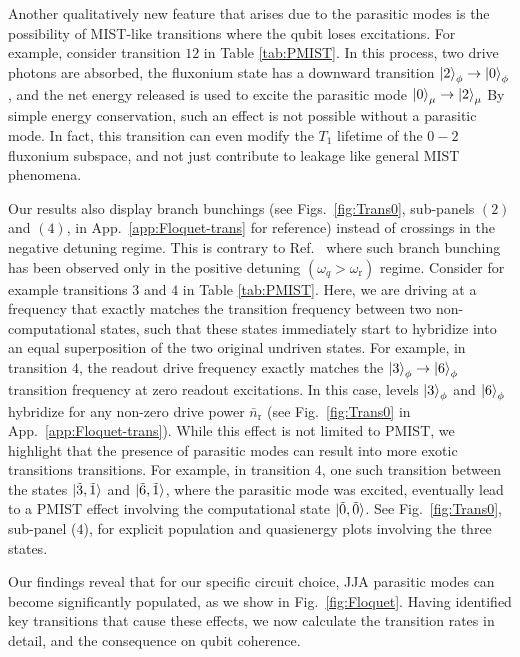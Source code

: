 \documentclass[%
reprint,
superscriptaddress,
 amsmath,amssymb,
 aps,
 prx,
longbibliography,
floatfix,
]{revtex4-2}
\begin{document}
Another qualitatively new feature that arises due to the parasitic modes is the possibility of MIST-like transitions where the qubit loses excitations.  For example, consider transition $12$ in Table \ref{tab:PMIST}. In this process, two drive photons are absorbed, the fluxonium state has a downward transition $\ket{2}_\phi\rightarrow\ket{0}_\phi$, and the net energy released is used to excite the parasitic mode $\ket{0}_\mu\rightarrow \ket{2}_\mu$ By simple energy conservation, such an effect is not possible without a parasitic mode. In fact, this transition can even modify the $T_1$ lifetime of the $0-2$ fluxonium subspace, and not just contribute to leakage like general MIST phenomena.

Our results also display branch bunchings (see Figs.~\ref{fig:Trans0}, sub-panels $(2)$ and $(4)$, in App.~\ref{app:Floquet-trans} for reference) instead of crossings in the negative detuning regime. This is contrary to Ref.~\cite{dumas2024unified} where such branch bunching has been observed only in the positive detuning $(\omega_q>\omega_\textrm{r})$ regime.  Consider for example transitions $3$ and $4$ in Table \ref{tab:PMIST}. Here, we are  driving at a frequency that exactly matches the transition frequency between two non-computational states, such that these states immediately start to hybridize into an equal superposition of the two 
original undriven states.  For example, in transition $4$, the readout drive frequency exactly matches the $\ket{3}_\phi \rightarrow \ket{6}_\phi$ transition frequency at zero readout excitations. In this case, levels $\ket{3}_\phi$ and $\ket{6}_\phi$ hybridize for any non-zero drive power $\bar n_\textrm{r}$  (see Fig.~\ref{fig:Trans0} in App.~\ref{app:Floquet-trans}). While this effect is not limited to PMIST, we highlight that the presence of parasitic modes can result into more exotic transitions transitions. For example, in transition  $4$, one such transition between the states $\ket{\tilde{3},\tilde{1}}$ and $\ket{\tilde{6},\tilde{1}}$, where the parasitic mode was excited, eventually lead to a PMIST effect involving the computational state $\ket{\tilde{0},\tilde{0}}$. See Fig.~\ref{fig:Trans0}, sub-panel ($4$), for explicit population and quasienergy plots involving the three states.



Our findings reveal that for our specific circuit choice, JJA parasitic modes can become significantly populated, as we show in Fig.~\ref{fig:Floquet}. Having identified key transitions that cause these effects, we now calculate the transition rates in detail, and the consequence on qubit coherence. 
\end{document}
